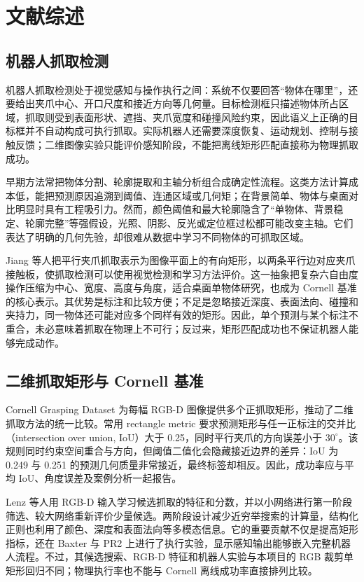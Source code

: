 \documentclass{l4proj}
\begin{document}
\chapter{文献综述}

\section{机器人抓取检测}
机器人抓取检测处于视觉感知与操作执行之间：系统不仅要回答“物体在哪里”，还要给出夹爪中心、开口尺度和接近方向等几何量。目标检测框只描述物体所占区域，抓取则受到表面形状、遮挡、夹爪宽度和碰撞风险约束，因此语义上正确的目标框并不自动构成可执行抓取。实际机器人还需要深度恢复、运动规划、控制与接触反馈；二维图像实验只能评价感知阶段，不能把离线矩形匹配直接称为物理抓取成功。

早期方法常把物体分割、轮廓提取和主轴分析组合成确定性流程。这类方法计算成本低，能把预测原因追溯到阈值、连通区域或几何矩；在背景简单、物体与桌面对比明显时具有工程吸引力。然而，颜色阈值和最大轮廓隐含了“单物体、背景稳定、轮廓完整”等强假设，光照、阴影、反光或定位框过松都可能改变主轴。它们表达了明确的几何先验，却很难从数据中学习不同物体的可抓取区域。

Jiang 等人把平行夹爪抓取表示为图像平面上的有向矩形，以两条平行边对应夹爪接触板，使抓取检测可以使用视觉检测和学习方法评价\citep{jiang2011efficient}。这一抽象把复杂六自由度操作压缩为中心、宽度、高度与角度，适合桌面单物体研究，也成为 Cornell 基准的核心表示。其优势是标注和比较方便；不足是忽略接近深度、表面法向、碰撞和夹持力，同一物体还可能对应多个同样有效的矩形。因此，单个预测与某个标注不重合，未必意味着抓取在物理上不可行；反过来，矩形匹配成功也不保证机器人能够完成动作。

\section{二维抓取矩形与 Cornell 基准}
Cornell Grasping Dataset 为每幅 RGB-D 图像提供多个正抓取矩形，推动了二维抓取方法的统一比较。常用 rectangle metric 要求预测矩形与任一正标注的交并比（intersection over union, IoU）大于 0.25，同时平行夹爪的方向误差小于 $30^\circ$。该规则同时约束空间重合与方向，但阈值二值化会隐藏接近边界的差异：IoU 为 0.249 与 0.251 的预测几何质量非常接近，最终标签却相反。因此，成功率应与平均 IoU、角度误差及案例分析一起报告。

Lenz 等人用 RGB-D 输入学习候选抓取的特征和分数，并以小网络进行第一阶段筛选、较大网络重新评价少量候选\citep{lenz2015deep}。两阶段设计减少近穷举搜索的计算量，结构化正则也利用了颜色、深度和表面法向等多模态信息。它的重要贡献不仅是提高矩形指标，还在 Baxter 与 PR2 上进行了执行实验，显示感知输出能够嵌入完整机器人流程。不过，其候选搜索、RGB-D 特征和机器人实验与本项目的 RGB 裁剪单矩形回归不同；物理执行率也不能与 Cornell 离线成功率直接排列比较。
\end{document}
